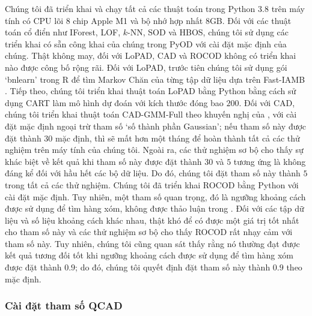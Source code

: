 \begin{itemize}
\end{itemize}Chúng tôi đã triển khai và chạy tất cả các thuật toán trong Python $3.8$ trên máy tính có CPU lõi 8 chip Apple M1 và bộ nhớ hợp nhất 8GB. Đối với các thuật toán cổ điển như IForest, LOF, $k$-NN, SOD và HBOS, chúng tôi sử dụng các triển khai có sẵn công khai của chúng trong PyOD \citep{zhao2019pyod} với cài đặt mặc định của chúng. Thật không may, đối với LoPAD, CAD và ROCOD không có triển khai nào được công bố rộng rãi. Đối với LoPAD, trước tiên chúng tôi sử dụng gói `bnlearn' \citep{scutari2019package} trong R để tìm Markov Chăn của từng tập dữ liệu dựa trên Fast-IAMB \citep{yaramakala2005speculative}. Tiếp theo, chúng tôi triển khai thuật toán LoPAD bằng Python bằng cách sử dụng CART \citep{breiman2017classification} làm mô hình dự đoán với kích thước đóng bao $200$. Đối với CAD, chúng tôi triển khai thuật toán CAD-GMM-Full theo khuyến nghị của \cite{song2007conditional}, với cài đặt mặc định ngoại trừ tham số `số thành phần Gaussian'; nếu tham số này được đặt thành 30 mặc định, thì sẽ mất hơn một tháng để hoàn thành tất cả các thử nghiệm trên máy tính của chúng tôi. Ngoài ra, các thử nghiệm sơ bộ cho thấy sự khác biệt về kết quả khi tham số này được đặt thành $30$ và $5$ tương ứng là không đáng kể đối với hầu hết các bộ dữ liệu. Do đó, chúng tôi đặt tham số này thành $5$ trong tất cả các thử nghiệm. Chúng tôi đã triển khai ROCOD bằng Python với cài đặt mặc định. Tuy nhiên, một tham số quan trọng, đó là ngưỡng khoảng cách được sử dụng để tìm hàng xóm, không được thảo luận trong \cite{liang2016robust}. Đối với các tập dữ liệu và số liệu khoảng cách khác nhau, thật khó để có được một giá trị tốt nhất cho tham số này và các thử nghiệm sơ bộ cho thấy ROCOD rất nhạy cảm với tham số này. Tuy nhiên, chúng tôi cũng quan sát thấy rằng nó thường đạt được kết quả tương đối tốt khi ngưỡng khoảng cách được sử dụng để tìm hàng xóm được đặt thành $0.9$; do đó, chúng tôi quyết định đặt tham số này thành $0.9$ theo mặc định.

\subsubsection{Cài đặt tham số QCAD}
\label{subsec:ParametersSettings}


